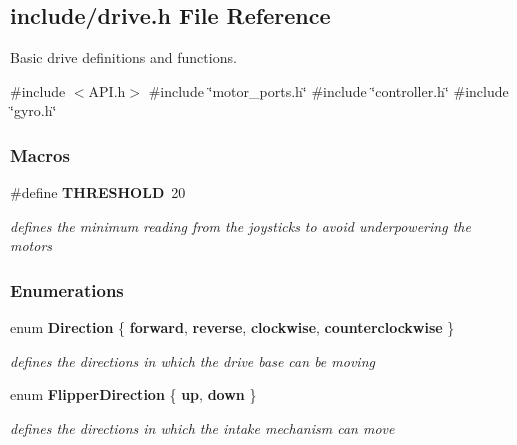 \subsection{include/drive.h File Reference}
\label{drive_8h}


Basic drive definitions and functions.  


{\ttfamily \#include $<$A\+P\+I.\+h$>$}\newline
{\ttfamily \#include \char`\"{}motor\+\_\+ports.\+h\char`\"{}}\newline
{\ttfamily \#include \char`\"{}controller.\+h\char`\"{}}\newline
{\ttfamily \#include \char`\"{}gyro.\+h\char`\"{}}\newline
\subsubsection*{Macros}
\begin{DoxyCompactItemize}
\item 
\#define \textbf{ T\+H\+R\+E\+S\+H\+O\+LD}~20
\begin{DoxyCompactList}\small\item\em defines the minimum reading from the joysticks to avoid underpowering the motors \end{DoxyCompactList}\end{DoxyCompactItemize}
\subsubsection*{Enumerations}
\begin{DoxyCompactItemize}
\item 
enum \textbf{ Direction} \{ {\bfseries forward}, 
{\bfseries reverse}, 
{\bfseries clockwise}, 
{\bfseries counterclockwise}
 \}
\begin{DoxyCompactList}\small\item\em defines the directions in which the drive base can be moving \end{DoxyCompactList}\item 
enum \textbf{ Flipper\+Direction} \{ {\bfseries up}, 
{\bfseries down}
 \}
\begin{DoxyCompactList}\small\item\em defines the directions in which the intake mechanism can move \end{DoxyCompactList}\end{DoxyCompactItemize}
